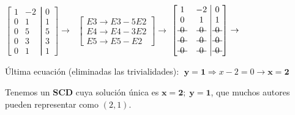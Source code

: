 \begin{proofw}
 \noindent $\left[ \begin{matrix}
  1 & -2   \\ 0 & 1  \\ 0 & 5  \\ 0 & 3 \\ 0 & 1  
 \end{matrix}\right. 
 \left| \begin{matrix}
   0 \\ 1 \\ 5 \\ 3 \\ 1  
 \end{matrix}\right] \to \; $
 \textcolor{gris}{$\left[ \begin{matrix} E3\to E3-5E2 \\ E4\to E4-3E2 \\ E5 \to E5-E2  \end{matrix} \right] \to $}
 $\left[ \begin{matrix}
  1 & -2   \\ 0 & 1  \\ \text{\textst{ 0 }}  & \text{\textst{ 0 }}   \\ \text{\textst{ 0 }}  & \text{\textst{ 0 }}  \\ \text{\textst{ 0 }}  & \text{\textst{ 0 }}   
 \end{matrix}\right. 
 \left| \begin{matrix}
   0 \\ 1 \\ \text{\textst{ 0 }}  \\ \text{\textst{ 0 }}  \\ \text{\textst{ 0 }}   
 \end{matrix}\right] \to \; $ 
 
 Última ecuación (eliminadas las trivialidades): $\; \boldsymbol{y=1} \Rightarrow x-2=0 \to \boldsymbol{x=2}$

Tenemos un \textbf{SCD} cuya solución única es $\boldsymbol{x=2; \; y=1}$, que muchos autores pueden representar como $(2,1)$.
\end{proofw}


